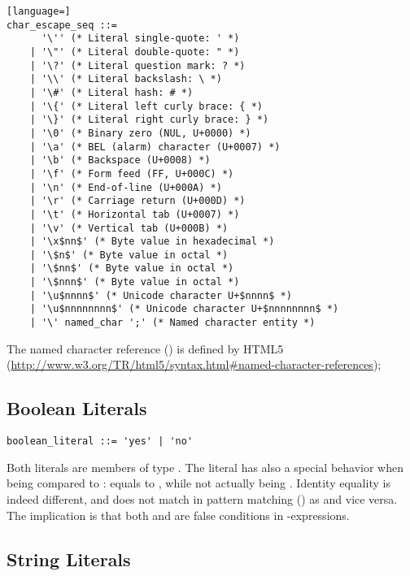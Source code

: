 \syntax\begin{lstlisting}[language=]
char_escape_seq ::= 
      '\'' (* Literal single-quote: ' *)
    | '\"' (* Literal double-quote: " *)
    | '\?' (* Literal question mark: ? *)
    | '\\' (* Literal backslash: \ *)
    | '\#' (* Literal hash: # *)
    | '\{' (* Literal left curly brace: { *)
    | '\}' (* Literal right curly brace: } *)
    | '\0' (* Binary zero (NUL, U+0000) *)
    | '\a' (* BEL (alarm) character (U+0007) *)
    | '\b' (* Backspace (U+0008) *)
    | '\f' (* Form feed (FF, U+000C) *)
    | '\n' (* End-of-line (U+000A) *)
    | '\r' (* Carriage return (U+000D) *)
    | '\t' (* Horizontal tab (U+0007) *)
    | '\v' (* Vertical tab (U+000B) *)
    | '\x$nn$' (* Byte value in hexadecimal *) 
    | '\$n$' (* Byte value in octal *)
    | '\$nn$' (* Byte value in octal *)
    | '\$nnn$' (* Byte value in octal *)
    | '\u$nnnn$' (* Unicode character U+$nnnn$ *)
    | '\u$nnnnnnnn$' (* Unicode character U+$nnnnnnnn$ *)
    | '\' named_char ';' (* Named character entity *)
\end{lstlisting}

The named character reference () is defined by HTML5 (\url{http://www.w3.org/TR/html5/syntax.html#named-character-references});






\subsection{Boolean Literals}
\label{sec:booleanliterals}

\syntax\begin{lstlisting}
boolean_literal ::= 'yes' | 'no'
\end{lstlisting}

Both literals are members of type \lstinline@Boolean@. The \lstinline@no@ literal has also a special behavior when being compared to \lstinline@nil@: \lstinline@no@ equals to \lstinline@nil@, while not actually being \lstinline@nil@. Identity equality is indeed different, and  does not match in pattern matching () as  and vice versa. The implication is that both \lstinline@nil@ and \lstinline@no@ are false conditions in \lstinline@if@-expressions. 





\subsection{String Literals}
\label{sec:stringliterals}


